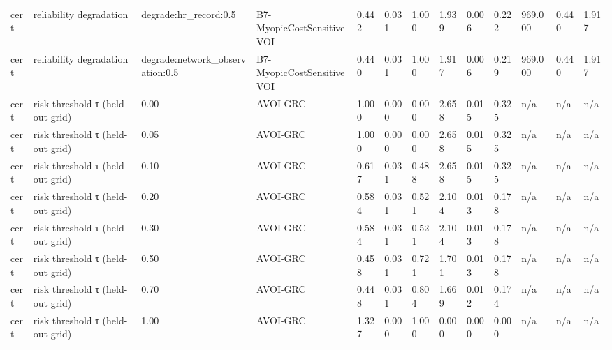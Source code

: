 \begin{table}[!ht]
{\begin{tabular}{lllllllllllll}
cert & reliability degradation & degrade:hr\_record:0.5 & B7-MyopicCostSensitiveVOI & 0.442 & 0.031 & 1.000 & 1.939 & 0.006 & 0.222 & 969.000 & 0.440 & 1.917 \\
cert & reliability degradation & degrade:network\_observation:0.5 & B7-MyopicCostSensitiveVOI & 0.440 & 0.031 & 1.000 & 1.917 & 0.006 & 0.219 & 969.000 & 0.440 & 1.917 \\
cert & risk threshold τ (held-out grid) & 0.00 & AVOI-GRC & 1.000 & 0.000 & 0.000 & 2.658 & 0.015 & 0.325 & n/a & n/a & n/a \\
cert & risk threshold τ (held-out grid) & 0.05 & AVOI-GRC & 1.000 & 0.000 & 0.000 & 2.658 & 0.015 & 0.325 & n/a & n/a & n/a \\
cert & risk threshold τ (held-out grid) & 0.10 & AVOI-GRC & 0.617 & 0.031 & 0.488 & 2.658 & 0.015 & 0.325 & n/a & n/a & n/a \\
cert & risk threshold τ (held-out grid) & 0.20 & AVOI-GRC & 0.584 & 0.031 & 0.521 & 2.104 & 0.013 & 0.178 & n/a & n/a & n/a \\
cert & risk threshold τ (held-out grid) & 0.30 & AVOI-GRC & 0.584 & 0.031 & 0.521 & 2.104 & 0.013 & 0.178 & n/a & n/a & n/a \\
cert & risk threshold τ (held-out grid) & 0.50 & AVOI-GRC & 0.458 & 0.031 & 0.721 & 1.701 & 0.013 & 0.178 & n/a & n/a & n/a \\
cert & risk threshold τ (held-out grid) & 0.70 & AVOI-GRC & 0.448 & 0.031 & 0.804 & 1.669 & 0.012 & 0.174 & n/a & n/a & n/a \\
cert & risk threshold τ (held-out grid) & 1.00 & AVOI-GRC & 1.327 & 0.000 & 1.000 & 0.000 & 0.000 & 0.000 & n/a & n/a & n/a \\
\bottomrule
\end{tabular}}
\end{table}
